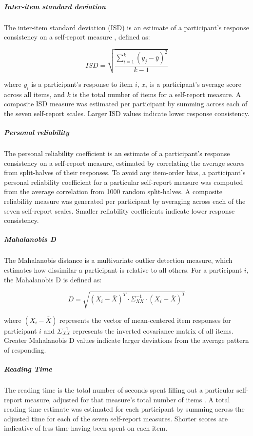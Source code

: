 \documentclass[a4paper,notitlepage,12pt]{article}
\begin{document}
\begin{refsection}[main]
\subparagraph{Inter-item standard deviation} The inter-item standard deviation (ISD) is an estimate of a participant's response consistency on a self-report measure \cite{marjanovic2015inter}, defined as:

\begin{equation*}
    ISD = \sqrt{\frac{\sum^k_{i=1}(y_j - \bar{y})^2}{k-1}}
\end{equation*}

where $y_i$ is a participant's response to item $i$, $x_i$ is a participant's average score across all  items, and $k$ is the total number of items for a self-report measure. A composite ISD measure was estimated per participant by summing across each of the seven self-report scales. Larger ISD values indicate lower response consistency.

\subparagraph{Personal reliability} 

The personal reliability coefficient is an estimate of a participant's response consistency on a self-report measure, estimated by correlating the average scores from split-halves of their responses. To avoid any item-order bias, a participant's personal reliability coefficient for a particular self-report measure was computed from the average correlation from 1000 random split-halves. A composite reliability measure was generated per participant by averaging across each of the seven self-report scales. Smaller reliability coefficients indicate lower response consistency.  
\subparagraph{Mahalanobis D} The Mahalanobis distance is a multivariate outlier detection measure, which estimates how dissimilar a participant is relative to all others. For a participant $i$, the Mahalanobis D is defined as:

\begin{equation*}
    D = \sqrt{(X_i - \bar{X})^T \cdot \Sigma^{-1}_{XX} \cdot (X_i - \bar{X})^T }
\end{equation*}

where $(X_i - \bar{X})$ represents the vector of mean-centered item responses for participant $i$ and $\Sigma^{-1}_{XX}$ represents the inverted covariance matrix of all items. Greater Mahalanobis D values indicate larger deviations from the average pattern of responding.

\subparagraph{Reading Time} The reading time is the total number of seconds spent filling out a particular self-report measure, adjusted for that measure's total number of items \cite{ophir2020turker}. A total reading time estimate was estimated for each participant by summing across the adjusted time for each of the seven self-report measures. Shorter scores are indicative of less time having been spent on each item.


\end{refsection}
\end{document}
